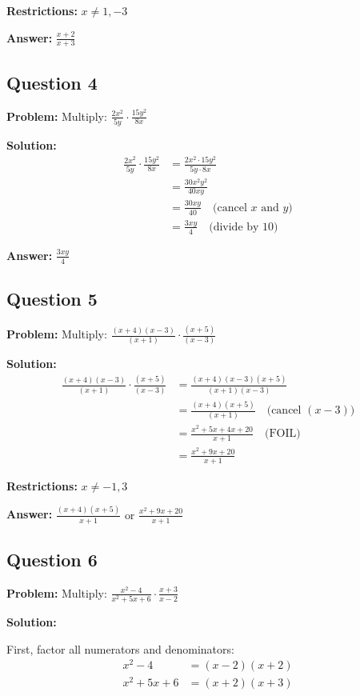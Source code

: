 \documentclass[12pt]{article}
\begin{document}
\textbf{Restrictions:} $x \neq 1, -3$

\textbf{Answer:} $\boxed{\frac{x+2}{x+3}}$

\subsection*{Question 4}
\textbf{Problem:} Multiply: $\frac{2x^2}{5y} \cdot \frac{15y^2}{8x}$

\textbf{Solution:}
\begin{align*}
\frac{2x^2}{5y} \cdot \frac{15y^2}{8x} &= \frac{2x^2 \cdot 15y^2}{5y \cdot 8x} \\
&= \frac{30x^2y^2}{40xy} \\
&= \frac{30xy}{40} \quad \text{(cancel } x \text{ and } y \text{)} \\
&= \frac{3xy}{4} \quad \text{(divide by 10)}
\end{align*}

\textbf{Answer:} $\boxed{\frac{3xy}{4}}$

\subsection*{Question 5}
\textbf{Problem:} Multiply: $\frac{(x+4)(x-3)}{(x+1)} \cdot \frac{(x+5)}{(x-3)}$

\textbf{Solution:}
\begin{align*}
\frac{(x+4)(x-3)}{(x+1)} \cdot \frac{(x+5)}{(x-3)} &= \frac{(x+4)(x-3)(x+5)}{(x+1)(x-3)} \\
&= \frac{(x+4)(x+5)}{(x+1)} \quad \text{(cancel } (x-3) \text{)} \\
&= \frac{x^2 + 5x + 4x + 20}{x+1} \quad \text{(FOIL)} \\
&= \frac{x^2 + 9x + 20}{x+1}
\end{align*}

\textbf{Restrictions:} $x \neq -1, 3$

\textbf{Answer:} $\boxed{\frac{(x+4)(x+5)}{x+1} \text{ or } \frac{x^2+9x+20}{x+1}}$

\subsection*{Question 6}
\textbf{Problem:} Multiply: $\frac{x^2-4}{x^2+5x+6} \cdot \frac{x+3}{x-2}$

\textbf{Solution:}

First, factor all numerators and denominators:
\begin{align*}
x^2 - 4 &= (x-2)(x+2) \\
x^2 + 5x + 6 &= (x+2)(x+3)
\end{align*}
\end{document}
